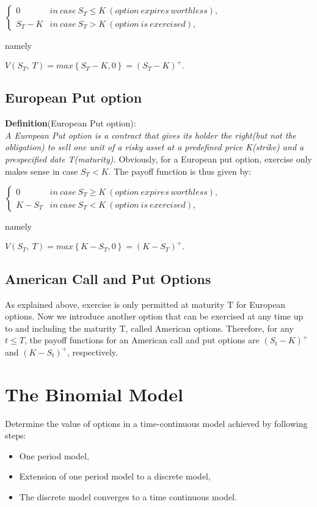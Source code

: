 \documentclass{article}
\begin{document}
\begin{center}
	$\begin{cases}0&in\  case\  S_{T}\leqslant K\  \left( option\  expires\  worthless\right),  \\ S_{T}-K&in\  case\  S_{T}>K\  \left( option\  is\  exercised\right),  \end{cases}$
\end{center}
namely
\begin{center}
	$V\left( S_{T},\  T\right)  =max\left\{ S_{T}-K,0\right\}  =\left( S_{T}-K\right)^{+}.$
\end{center}


\subsection{European Put option}
\textbf{Definition}(European Put option):\\
\textit{A European Put option is a contract that gives its holder the right(but not the obligation) to sell one unit of a risky asset at a predefined price K(strike) and a prespecified date T(maturity).}
Obviously, for a European put option, exercise only makes sense in case $S_{T}<K$. The payoff function is thus given by:

\begin{center}
	$\begin{cases}0&in\  case\  S_{T}\geqslant K\  \left( option\  expires\  worthless\right),  \\ K-S_{T}&in\  case\  S_{T}<K\  \left( option\  is\  exercised\right),  \end{cases} $
\end{center}
namely
\begin{center}
	$V\left( S_{T},\  T\right)  =max\left\{ K-S_{T},0\right\}  =\left( K-S_{T}\right)^{+}. $
\end{center}

\subsection{American Call and Put Options}
As explained above, exercise is only permitted at maturity T for European options. Now we introduce another option that can be exercised at any time up to and including the maturity T, called American options. Therefore, for any $t\leqslant T$, the payoff functions for an American call and put options are $(S_{t}-K)^{+}$ and $(K-S_{t})^{+}$, respectively.



\section{The Binomial Model}
Determine the value of options in a time-continuous model achieved by following steps:
\begin{itemize}
	\item One period model,
	\item Extension of one period model to a discrete model,
	\item The discrete model converges to a time continuous model.
	\end{itemize}
\end{document}
